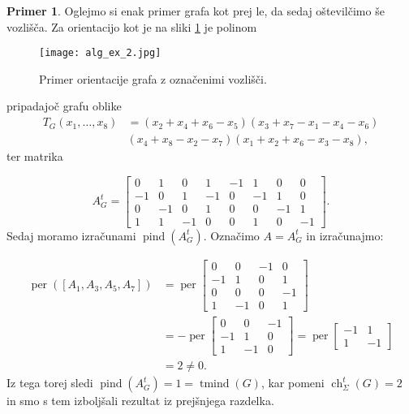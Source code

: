 \documentclass[12pt,a4paper,twoside]{article}
\theoremstyle{definition} %
\newtheorem{primer}[definicija]{Primer}
\theoremstyle{plain} %
\newcommand{\eclt}{\ch_{\Sigma}^t}
\numberwithin{equation}{section}  %
\DeclareMathOperator{\per}{per}
\DeclareMathOperator{\tmind}{tmind}
\DeclareMathOperator{\pind}{pind}
\DeclareMathOperator{\ch}{ch}
\begin{document}
\begin{primer}
Oglejmo si enak primer grafa kot prej le, da sedaj oštevilčimo še vozlišča. Za orientacijo kot je na sliki \ref{ex_2} je polinom
 \begin{figure}[h!]
\caption{Primer orientacije grafa z označenimi vozlišči.}
\label{ex_2}
\centering
    \texttt{[image: alg\_ex\_2.jpg]}
    \end{figure}
pripadajoč grafu oblike 
\begin{equation*}
\begin{split}
T_G(x_1, \ldots, x_8) &= (x_2 + x_4 + x_6 - x_5)(x_3 + x_7 - x_1 - x_4 - x_6) \\
&(x_4 + x_8 - x_2 - x_7)(x_1 + x_2 + x_6 - x_3 - x_8),
\end{split}
\end{equation*}
 ter matrika 

$$A_G^t = \left[ \begin{matrix} 0 & 1 & 0 & 1 & -1 & 1 & 0 & 0 \\ -1 & 0 & 1 & -1 & 0 & -1 & 1 & 0 \\ 0 & -1 & 0 & 1 & 0 & 0 & -1 & 1 \\ 1 & 1 & -1 & 0 & 0 & 1 & 0 & -1 \end{matrix} \right].$$
Sedaj moramo izračunami $\pind(A_G^t)$. Označimo $A =A_G^t$ in izračunajmo:

\begin{equation*}
\begin{split}
 \per([A_1, A_3, A_5, A_7]) &= \per\left[ \begin{matrix} 0 & 0 & -1 & 0 \\ -1 & 1 & 0 & 1 \\ 0 & 0 & 0 & -1 \\ 1 & -1 & 0 & 1 \end{matrix} \right] \\
&= -\per\left[ \begin{matrix} 0 & 0 & -1 \\ -1 & 1 & 0 \\ 1 & -1 & 0 \end{matrix} \right] =\per\left[ \begin{matrix} -1 & 1 \\ 1 & -1 \end{matrix} \right] \\
&=2 \neq 0.
\end{split}
\end{equation*}
Iz tega torej sledi $\pind(A_G^t) = 1 =\tmind(G)$, kar pomeni $\eclt(G) = 2$ in smo s tem izboljšali rezultat iz prejšnjega razdelka.
\end{primer}
\end{document}
